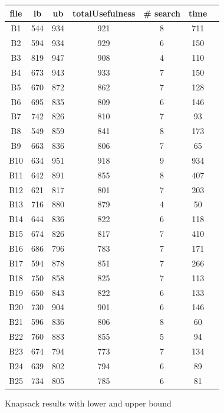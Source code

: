 \documentclass[a4paper ,12pt,french]{article}
\begin{document}
\begin{figure}[!h]
\begin{tabular}{|c|c|c|c|c|c|c|}
\hline
file&lb&ub&totalUsefulness&\# search&time\\
\hline
\hline

B1&544&934&921&8&711\\\hline
B2&594&934&929&6&150\\\hline
B3&819&947&908&4&110\\\hline
B4&673&943&933&7&150\\\hline
B5&670&872&862&7&128\\\hline
B6&695&835&809&6&146\\\hline
B7&742&826&810&7&93\\\hline
B8&549&859&841&8&173\\\hline
B9&663&836&806&7&65\\\hline
B10&634&951&918&9&934\\\hline
B11&642&891&855&8&407\\\hline
B12&621&817&801&7&203\\\hline
B13&716&880&879&4&50\\\hline
B14&644&836&822&6&118\\\hline
B15&674&826&817&7&410\\\hline
B16&686&796&783&7&171\\\hline
B17&594&878&851&7&266\\\hline
B18&750&858&825&7&113\\\hline
B19&650&843&822&6&133\\\hline
B20&730&904&901&6&146\\\hline
B21&596&836&806&8&60\\\hline
B22&760&883&855&5&94\\\hline
B23&674&794&773&7&134\\\hline
B24&639&802&794&6&89\\\hline
B25&734&805&785&6&81\\\hline

\end{tabular}
\caption{Knapsack results with lower and upper bound}
\label{LUB}
\end{figure}
\end{document}
